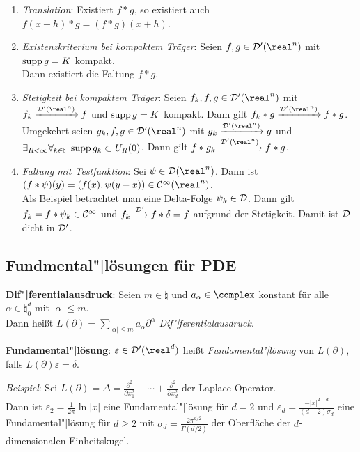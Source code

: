 \begin{enumerate}
    \item
    \emph{Translation}:
    Existiert $f \ast g$, so existiert auch
    $f(x + h) \ast g = (f \ast g)(x + h)$.

    \item
    \emph{Existenzkriterium bei kompaktem Träger}:
    Seien $f, g \in \D'(\real^n)$ mit $\operatorname{supp} g = K$ kompakt.\\
    Dann existiert die Faltung $f \ast g$.

    \item
    \emph{Stetigkeit bei kompaktem Träger}:
    Seien $f_k, f, g \in \D'(\real^n)$ mit $f_k \xrightarrow{\D'(\real^n)} f$
    und $\operatorname{supp} g = K$ kompakt.
    Dann gilt $f_k \ast g \xrightarrow{\D'(\real^n)} f \ast g$.
    Umgekehrt seien $g_k, f, g \in \D'(\real^n)$ mit
    $g_k \xrightarrow{\D'(\real^n)} g$
    und $\exists_{R < \infty} \forall_{k \in \natural}\;
    \operatorname{supp} g_k \subset U_R(0)$.
    Dann gilt $f \ast g_k \xrightarrow{\D'(\real^n)} f \ast g$.

    \item
    \emph{Faltung mit Testfunktion}:
    Sei $\psi \in \D(\real^n)$.
    Dann ist $(f \ast \psi)(y) = (f(x), \psi(y - x)) \in \C^\infty(\real^n)$.\\
    Als Beispiel betrachtet man eine Delta-Folge $\psi_k \in \mathcal{D}$.
    Dann gilt $f_k = f \ast \psi_k \in \mathcal{C}^\infty$ und
    $f_k \xrightarrow{\mathcal{D}'} f \ast \delta = f$ aufgrund der Stetigkeit.
    Damit ist $\mathcal{D}$ dicht in $\mathcal{D}'$.
\end{enumerate}

\subsection{%
    Fundmental"|lösungen für PDE%
}

\textbf{Dif"|ferentialausdruck}:
Seien $m \in \natural$ und $a_\alpha \in \complex$ konstant für alle
$\alpha \in \natural_0^d$ mit $|\alpha| \le m$.\\
Dann heißt $L(\partial) = \sum_{|\alpha| \le m} a_\alpha \partial^\alpha$
\emph{Dif"|ferentialausdruck}.

\textbf{Fundamental"|lösung}:
$\varepsilon \in \D'(\real^d)$ heißt \emph{Fundamental"|lösung} von
$L(\partial)$, falls $L(\partial) \varepsilon = \delta$.

\emph{Beispiel}: Sei $L(\partial) = \Delta =
\frac{\partial^2}{\partial x_1^2} + \dotsb +
\frac{\partial^2}{\partial x_d^2}$ der Laplace-Operator.\\
Dann ist $\varepsilon_2 = \frac{1}{2\pi} \ln |x|$
eine Fundamental"|lösung für $d = 2$ und
$\varepsilon_d = \frac{-|x|^{2-d}}{(d - 2)\sigma_d}$
eine Fundamental"|lösung für $d \ge 2$ mit
$\sigma_d = \frac{2\pi^{d/2}}{\Gamma(d/2)}$
der Oberfläche der $d$-dimensionalen Einheitskugel.

